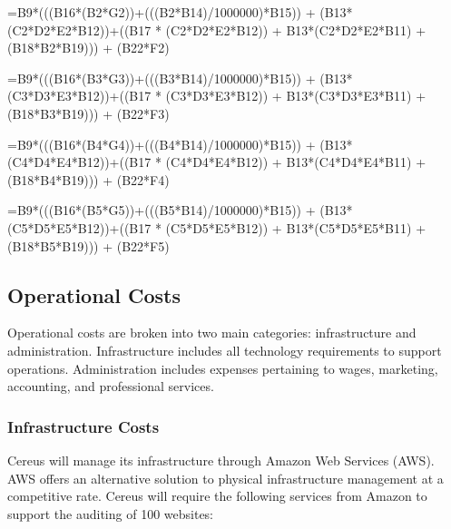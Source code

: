=B9*(((B16*(B2*G2))+(((B2*B14)/1000000)*B15)) + (B13*(C2*D2*E2*B12))+((B17 * (C2*D2*E2*B12)) + B13*(C2*D2*E2*B11) + (B18*B2*B19))) + (B22*F2)

=B9*(((B16*(B3*G3))+(((B3*B14)/1000000)*B15)) + (B13*(C3*D3*E3*B12))+((B17 * (C3*D3*E3*B12)) + B13*(C3*D3*E3*B11) + (B18*B3*B19))) + (B22*F3)

=B9*(((B16*(B4*G4))+(((B4*B14)/1000000)*B15)) + (B13*(C4*D4*E4*B12))+((B17 * (C4*D4*E4*B12)) + B13*(C4*D4*E4*B11) + (B18*B4*B19))) + (B22*F4)

=B9*(((B16*(B5*G5))+(((B5*B14)/1000000)*B15)) + (B13*(C5*D5*E5*B12))+((B17 * (C5*D5*E5*B12)) + B13*(C5*D5*E5*B11) + (B18*B5*B19))) + (B22*F5)

\subsection{Operational Costs}

Operational costs are broken into two main categories: infrastructure and administration. Infrastructure includes all technology requirements to support operations. Administration includes expenses pertaining to wages, marketing, accounting, and professional services.

\subsubsection{Infrastructure Costs}

Cereus will manage its infrastructure through Amazon Web Services (AWS). AWS offers an alternative solution to physical infrastructure management at a competitive rate. Cereus will require the following services from Amazon to support the auditing of 100 websites:

